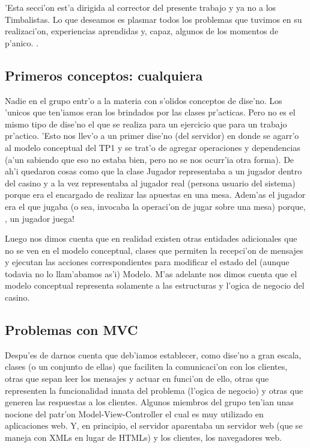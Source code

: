 'Esta secci'on est'a dirigida al corrector del presente trabajo y ya no a los Timbalistas. Lo que deseamos es plasmar todos los problemas que tuvimos en su realizaci'on, experiencias aprendidas y, capaz, algunos de los momentos de p'anico. .

\subsection{Primeros conceptos: cualquiera}
Nadie en el grupo entr'o a la materia con s'olidos conceptos de dise'no. Los 'unicos que ten'iamos eran los brindados por las clases pr'acticas. Pero no es el mismo tipo de dise'no el que se realiza para un ejercicio que para un trabajo pr'actico. 'Esto nos llev'o a un primer dise'no (del servidor) en donde se agarr'o al modelo conceptual del TP1 y se trat'o de agregar operaciones y dependencias (a'un sabiendo que eso no estaba bien, pero no se nos ocurr'ia otra forma). De ah'i quedaron cosas como que la clase Jugador representaba a un jugador dentro del casino y a la vez representaba al jugador real (persona usuario del sistema) porque era el encargado de realizar las apuestas en una mesa. Adem'as el jugador era el que jugaba (o sea, invocaba la operaci'on de jugar sobre una mesa) porque, , un jugador juega!

Luego nos dimos cuenta que en realidad existen otras entidades adicionales que no se ven en el modelo conceptual, clases que permiten la recepci'on de mensajes y ejecutan las acciones correspondientes para modificar el estado del (aunque todavia no lo llam'abamos as'i) Modelo. M'as adelante nos dimos cuenta que el modelo conceptual representa solamente a las estructuras y l'ogica de negocio del casino.


\subsection{Problemas con MVC}
Despu'es de darnos cuenta que deb'iamos establecer, como dise'no a gran escala, clases (o un conjunto de ellas) que faciliten la comunicaci'on con los clientes, otras que sepan leer los mensajes y actuar en funci'on de ello, otras que representen la funcionalidad innata del problema (l'ogica de negocio) y otras que generen las respuestas a los clientes. Algunos miembros del grupo ten'ian unas nocione del patr'on Model-View-Controller el cual es muy utilizado en aplicaciones web. Y, en principio, el servidor aparentaba un servidor web (que se maneja con XMLs en lugar de HTMLs) y los clientes, los navegadores web.

